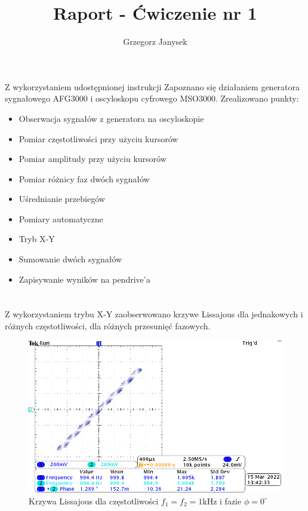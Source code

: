 \documentclass[11pt]{extarticle}
\author{Grzegorz Janysek}
\title{Raport - Ćwiczenie nr 1}
\begin{document}
	\maketitle
	
	\section{}
	Z wykorzystaniem udostępnionej instrukcji Zapoznano się działaniem generatora sygnałowego AFG3000 i oscyloskopu cyfrowego MSO3000.
	Zrealizowano punkty:
	\begin{itemize}
		\item Obserwacja sygnałów z generatora na oscyloskopie
		\item Pomiar częstotliwości przy użyciu kursorów
		\item Pomiar amplitudy przy użyciu kursorów
		\item Pomiar różnicy faz dwóch sygnałów
		\item Uśrednianie przebiegów
		\item Pomiary automatyczne
		\item Tryb X-Y
		\item Sumowanie dwóch sygnałów
		\item Zapisywanie wyników na pendrive'a
	\end{itemize}

	\clearpage 
	\section{}
	Z wykorzystaniem trybu X-Y zaobserwowano krzywe Lissajous dla jednakowych i różnych częstotliwości, dla różnych przesunięć fazowych.

	\begin{figure}[htp]
		\centering
		\includegraphics[width=\textwidth]{include/2/3.png}
		\caption{Krzywa Lissajous dla częstotliwości \(f_1=f_2=1\text{kHz}\) i fazie \(\phi=0^{\circ}\)}
	\end{figure}
\end{document}
